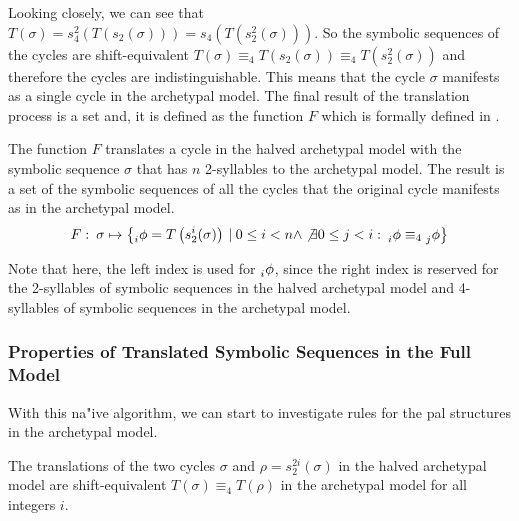 Looking closely, we can see that $T(\sigma) = s_4^2\left(T\left(s_2(\sigma)\right)\right) = s_4\left(T\left(s_2^2(\sigma)\right)\right)$.
So the symbolic sequences of the cycles are shift-equivalent $T(\sigma) \equiv_4 T\left(s_2(\sigma)\right) \equiv_4 T\left(s_2^2(\sigma)\right)$ and therefore the cycles are indistinguishable.
This means that the cycle $\sigma$ manifests as a single cycle in the archetypal model.
The final result of the translation process is a set and, it is defined as the function $F$ which is formally defined in .

\begin{definition}
	\label{def:F}
	The function $F$ translates a cycle in the halved archetypal model with the symbolic sequence $\sigma$ that has $n$ 2-syllables to the archetypal model.
	The result is a set of the symbolic sequences of all the cycles that the original cycle manifests as in the archetypal model.
	\begin{align}
		F:\: \sigma \mapsto \left\{
		\prescript{}{i}{\phi} = T\left(s_2^i(\sigma)\right) \:|\:
		0 \leq i < n \land
		\not\exists 0 \leq j < i:\: \prescript{}{i}{\phi} \equiv_4 \prescript{}{j}{\phi}
		\right\}
	\end{align}
\end{definition}

Note that here, the left index is used for $\prescript{}{i}{\phi}$, since the right index is reserved for the 2-syllables of symbolic sequences in the halved archetypal model and 4-syllables of symbolic sequences in the archetypal model.

\subsubsection{Properties of Translated Symbolic Sequences in the Full Model}

With this na"ive algorithm, we can start to investigate rules for the \gls{pal} structures in the archetypal model.

\begin{lemma}
	\label{lemma:equivalence.translations}
	The translations of the two cycles $\sigma$ and $\rho = s_2^{2i}(\sigma)$ in the halved archetypal model are shift-equivalent $T(\sigma) \equiv_4 T(\rho)$ in the archetypal model for all integers $i$.
\end{lemma}

